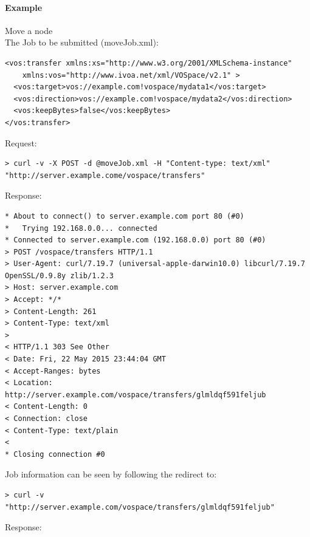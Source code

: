 \documentclass[11pt,a4paper]{ivoa}
\begin{document}
\paragraph{Example}
Move a node
\\[5px]
\noindent
The Job to be submitted (moveJob.xml):
\begin{lstlisting}
<vos:transfer xmlns:xs="http://www.w3.org/2001/XMLSchema-instance"
    xmlns:vos="http://www.ivoa.net/xml/VOSpace/v2.1" >
  <vos:target>vos://example.com!vospace/mydata1</vos:target>
  <vos:direction>vos://example.com!vospace/mydata2</vos:direction>
  <vos:keepBytes>false</vos:keepBytes>
</vos:transfer>
\end{lstlisting}
Request:
\begin{lstlisting}
> curl -v -X POST -d @moveJob.xml -H "Content-type: text/xml" "http://server.example.come/vospace/transfers"
\end{lstlisting}
Response:
\begin{lstlisting}
* About to connect() to server.example.com port 80 (#0)
*   Trying 192.168.0.0... connected
* Connected to server.example.com (192.168.0.0) port 80 (#0)
> POST /vospace/transfers HTTP/1.1
> User-Agent: curl/7.19.7 (universal-apple-darwin10.0) libcurl/7.19.7 OpenSSL/0.9.8y zlib/1.2.3
> Host: server.example.com
> Accept: */*
> Content-Length: 261
> Content-Type: text/xml
>
< HTTP/1.1 303 See Other
< Date: Fri, 22 May 2015 23:44:04 GMT
< Accept-Ranges: bytes
< Location: http://server.example.com/vospace/transfers/glmldqf591feljub
< Content-Length: 0
< Connection: close
< Content-Type: text/plain
<
* Closing connection #0
\end{lstlisting}
Job information can be seen by following the redirect to:
\begin{lstlisting}
> curl -v "http://server.example.com/vospace/transfers/glmldqf591feljub"
\end{lstlisting}
Response:
\end{document}
